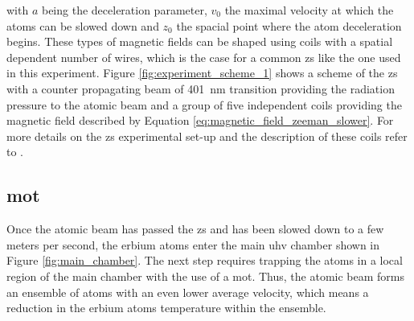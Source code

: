 with $a$ being the deceleration parameter, $v_0$ the maximal velocity at which the atoms can be slowed down and $z_0$ the spacial point where the atom deceleration begins. These types of magnetic fields can be shaped using coils with a spatial dependent number of wires, which is the case for a common \acf{zs} like the one used in this experiment. Figure \ref{fig:experiment_scheme_1} shows a scheme of the \ac{zs} with a counter propagating beam of \SI{401}{\nano\meter} transition providing the radiation pressure to the atomic beam and a group of five independent coils providing the magnetic field described by Equation \eqref{eq:magnetic_field_zeeman_slower}. For more details on the \ac{zs} experimental set-up and the description of these coils refer to \cite{Rehberger2013}.

\subsection{\Acl{mot}}

Once the atomic beam has passed the \ac{zs} and has been slowed down to a few meters per second, the erbium atoms enter the main \ac{uhv} chamber shown in Figure \ref{fig:main_chamber}. The next step requires trapping the atoms in a local region of the main chamber with the use of a \Acf{mot}. Thus, the atomic beam forms an ensemble of atoms with an even lower average velocity, which means a reduction in the erbium atoms temperature within the ensemble. 

